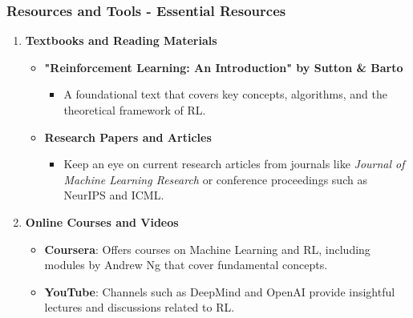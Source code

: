 \documentclass[aspectratio=169]{beamer}
\begin{document}
\begin{frame}[fragile]
    \frametitle{Resources and Tools - Essential Resources}
    \begin{enumerate}
        \item \textbf{Textbooks and Reading Materials}
            \begin{itemize}
                \item \textbf{"Reinforcement Learning: An Introduction" by Sutton \& Barto}
                    \begin{itemize}
                        \item A foundational text that covers key concepts, algorithms, and the theoretical framework of RL.
                    \end{itemize}
                \item \textbf{Research Papers and Articles}
                    \begin{itemize}
                        \item Keep an eye on current research articles from journals like \textit{Journal of Machine Learning Research} or conference proceedings such as NeurIPS and ICML.
                    \end{itemize}
            \end{itemize}
        \item \textbf{Online Courses and Videos}
            \begin{itemize}
                \item \textbf{Coursera}: Offers courses on Machine Learning and RL, including modules by Andrew Ng that cover fundamental concepts.
                \item \textbf{YouTube}: Channels such as DeepMind and OpenAI provide insightful lectures and discussions related to RL.
            \end{itemize}
    \end{enumerate}
\end{frame}
\end{document}
